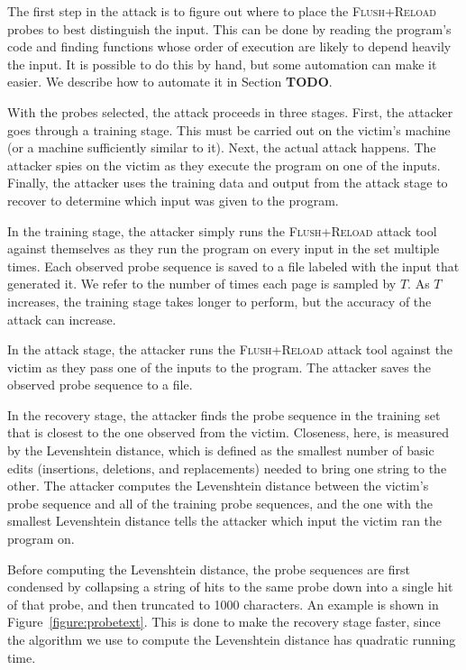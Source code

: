 \documentclass[letterpaper,twocolumn,10pt]{article}
\begin{document}
The first step in the attack is to figure out where to place the
\textsc{Flush+Reload} probes to best distinguish the input. This can be done by
reading the program's code and finding functions whose order of execution are
likely to depend heavily the input. It is possible to do this by hand, but some
automation can make it easier. We describe how to automate it in Section
\textbf{TODO}.

With the probes selected, the attack proceeds in three stages. First, the
attacker goes through a training stage. This must be carried out on the victim's
machine (or a machine sufficiently similar to it). Next, the actual attack happens. The
attacker spies on the victim as they execute the program on one of the inputs.
Finally, the attacker uses the training data and output from the attack stage to
recover to determine which input was given to the program.

In the training stage, the attacker simply runs the \textsc{Flush+Reload} attack
tool against themselves as they run the program on every input in the set
multiple times. Each observed probe sequence is saved to a file labeled with the
input that generated it. We refer to the number of times each page is sampled by
$T$. As $T$ increases, the training stage takes longer to perform, but the
accuracy of the attack can increase.

In the attack stage, the attacker runs the \textsc{Flush+Reload} attack tool
against the victim as they pass one of the inputs to the program. The attacker
saves the observed probe sequence to a file.

In the recovery stage, the attacker finds the probe sequence in the training set
that is closest to the one observed from the victim. Closeness, here, is
measured by the Levenshtein distance\cite{levenshtein1966binary}, which is
defined as the smallest number of basic edits (insertions, deletions, and
replacements) needed to bring one string to the other. The attacker computes the
Levenshtein distance between the victim's probe sequence and all of the training
probe sequences, and the one with the smallest Levenshtein distance tells the
attacker which input the victim ran the program on.

Before computing the Levenshtein distance, the probe sequences are first
condensed by collapsing a string of hits to the same probe down into a single
hit of that probe, and then truncated to 1000 characters. An example is shown in
Figure~\ref{figure:probetext}. This is done to make the recovery stage faster,
since the algorithm we use to compute the Levenshtein distance has quadratic
running time.
\end{document}
